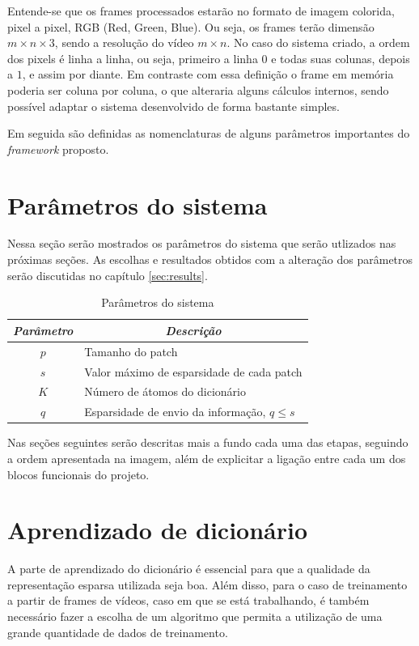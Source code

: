 \documentclass[cic,tc]{iiufrgs}
\begin{document}
Entende-se que os frames processados estarão no formato de imagem colorida,
pixel a pixel, RGB (Red, Green, Blue). 
Ou seja, os frames terão dimensão 
$m \times n \times 3$,
sendo a resolução do vídeo $m \times n$. 
No caso do sistema criado, a ordem dos pixels é 
linha a linha, ou seja, primeiro a linha $0$ e todas suas colunas, depois a $1$, e assim por diante.
Em contraste com essa definição o frame em memória poderia ser coluna por coluna, o que alteraria
alguns cálculos internos, sendo possível adaptar o sistema desenvolvido de forma bastante simples.

Em seguida são definidas as nomenclaturas de alguns parâmetros importantes do
\textit{framework} proposto.

\section{Parâmetros do sistema}
Nessa seção serão mostrados os parâmetros do sistema que serão utlizados nas próximas
seções. 
As escolhas e resultados obtidos com a alteração dos parâmetros serão discutidas no 
capítulo \ref{sec:results}.

\begin{table}[h]
    \caption{Parâmetros do sistema}
    \centering
        \begin{tabular}{|c|p{10cm}|}
          \hline
          \multicolumn{1}{|c|}{\textit{Parâmetro}} & 
            \multicolumn{1}{c|}{\textit{Descrição}}\\
          \hline
          \hline
          $p$    & Tamanho do patch \\ 
          $s$    & Valor máximo de esparsidade de cada patch \\     
          $K$    & Número de átomos do dicionário \\
          $q$    & Esparsidade de envio da informação, $q \le s$ \\
          \hline
        \end{tabular}
    \label{tbl:params}
\end{table}

Nas seções seguintes serão descritas mais a fundo cada uma das etapas, seguindo a ordem
apresentada na imagem, além de explicitar a ligação entre cada um dos blocos funcionais
do projeto.

\section{Aprendizado de dicionário}
\label{sec:learn}
A parte de aprendizado do dicionário é essencial para que a qualidade da representação
esparsa utilizada seja boa.
Além disso, para o caso de treinamento a partir de frames de vídeos, caso em que se está
trabalhando, é também necessário fazer a escolha de um algoritmo que permita a utilização
de uma grande quantidade de dados de treinamento.
\end{document}
